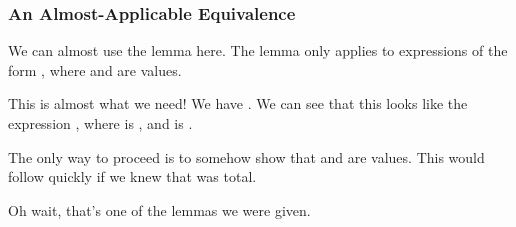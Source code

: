 \documentclass[aspectratio=169, handout]{beamer}
\begin{document}
\begin{frame}[fragile]
  \frametitle{An Almost-Applicable Equivalence}

  We can almost use the lemma here. The lemma only applies to expressions of
  the form , where  and  are values.

  \pause
  \vspace{\fill}

  This is almost what we need! We have .
  We can see that this looks like the expression , where
   is , and  is .

  \pause
  \vspace{\fill}

  The only way to proceed is to somehow show that  and 
  are values. This would follow quickly if we knew that  was total.

  \pause
  \vspace{\fill}

  Oh wait, that's one of the lemmas we were given.
\end{frame}
\end{document}
